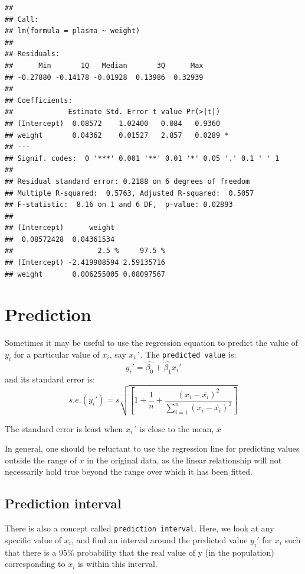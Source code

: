 \documentclass[]{article}
\begin{document}
\begin{verbatim}
## 
## Call:
## lm(formula = plasma ~ weight)
## 
## Residuals:
##      Min       1Q   Median       3Q      Max 
## -0.27880 -0.14178 -0.01928  0.13986  0.32939 
## 
## Coefficients:
##             Estimate Std. Error t value Pr(>|t|)  
## (Intercept)  0.08572    1.02400   0.084   0.9360  
## weight       0.04362    0.01527   2.857   0.0289 *
## ---
## Signif. codes:  0 '***' 0.001 '**' 0.01 '*' 0.05 '.' 0.1 ' ' 1
## 
## Residual standard error: 0.2188 on 6 degrees of freedom
## Multiple R-squared:  0.5763, Adjusted R-squared:  0.5057 
## F-statistic:  8.16 on 1 and 6 DF,  p-value: 0.02893
## 
## (Intercept)      weight 
##  0.08572428  0.04361534 
##                    2.5 %     97.5 %
## (Intercept) -2.419908594 2.59135716
## weight       0.006255005 0.08097567
\end{verbatim}

\hypertarget{prediction}{%
\section{Prediction}\label{prediction}}

Sometimes it may be useful to use the regression equation to predict the
value of \(y_i\) for a particular value of \(x_i\), say \(x_i´\). The
\texttt{predicted\ value} is: \[y_i'=\hat{\beta_0}+\hat{\beta_1}x_i'\]
and its standard error is:
\[s.e.(y_i')=s\sqrt{[1+\frac{1}{n}+\frac{(x_i-\overline{x_i})^2}{\sum_{i=1}^{n}(x_i-\overline{x_i})^2}]}\]

The standard error is least when \(x_i´\) is close to the mean,
\(\overline{x}\)

In general, one should be reluctant to use the regression line for
predicting values outside the range of \(x\) in the original data, as
the linear relationship will not necessarily hold true beyond the range
over which it has been fitted.

\hypertarget{prediction-interval}{%
\subsection{Prediction interval}\label{prediction-interval}}

There is also a concept called \texttt{prediction\ interval}. Here, we
look at any specific value of \(x_i\), and find an interval around the
predicted value \(y_i'\) for \(x_i\) such that there is a 95\%
probability that the real value of y (in the population) corresponding
to \(x_i\) is within this interval.
\end{document}
